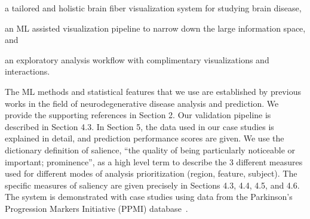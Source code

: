 \begin{compactitem}
	\item a tailored and holistic brain fiber visualization system for studying brain disease,
	\item an ML assisted visualization pipeline to narrow down the large information space, and
	\item an exploratory analysis workflow with complimentary visualizations and interactions.
\end{compactitem}

\color{black}

The ML methods and statistical features that we use are established by previous works in the field of neurodegenerative disease analysis and prediction. We provide the supporting references in Section 2. Our validation pipeline is described in Section 4.3. In Section 5, the data used in our case studies is explained in detail, and prediction performance scores are given. We use the dictionary definition of salience, “the quality of being particularly noticeable or important; prominence”, as a high level term to describe the 3 different measures used for different modes of analysis prioritization (region, feature, subject). The specific measures of saliency are given precisely in Sections 4.3, 4.4, 4.5, and 4.6. The system is demonstrated with 
case studies using data from 
the Parkinson's Progression Markers Initiative (PPMI) database~\cite{marek2011parkinson}. 

